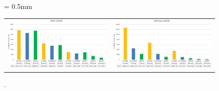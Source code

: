 \documentclass{sig-alternate-05-2015}
\begin{document}
\begin{figure}[t]
  \tabcolsep = 0.5mm              %
  \begin{tabular}{cc}
    \begin{minipage}[t]{0.49\textwidth}
    \includegraphics[width=1.0\linewidth]{../figure/BarGraph_matrix_with_cache.eps}
      \caption{.}
      \label{fig:}
    \end{minipage}   
    &
    \begin{minipage}[t]{0.49\textwidth}
      \includegraphics[width=1.0\linewidth]{../figure/BarGraph_matrix_without_cache.eps}
      \caption{.}
      \label{fig:}
    \end{minipage}
    \vspace{-3mm}
  \end{tabular}
  \vspace{-2mm}
\end{figure}
\end{document}
